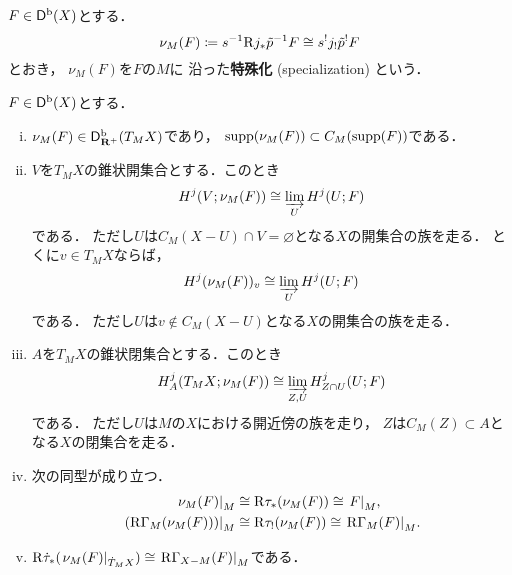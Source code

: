 \begin{DFN}
    \(F\in\Dompb(X)\)とする．
    \[ 
        \nu_{M}(F)\coloneqq 
        s^{-1}\Rder{j_{\ast}}\tilde{p}^{-1}F
        \cong
        s^{!}j_{!}\tilde{p}^{!}F
    \]
    とおき，
    \(\nu_{M}(F)\)を\(F\)の\(M\)に
    沿った\textbf{特殊化} (specialization) という．
\end{DFN}

\begin{THM}
    \(F\in\Dompb(X)\)とする．
    \begin{enumerate}[(i)]
        \item \(\nu_{M}(F)\in\Dbcon(T_{M}X)\)であり，
        \(\supp(\nu_{M}(F))\subset C_{M}(\supp(F))\)である．
        \item \(V\)を\(T_{M}X\)の錐状開集合とする．このとき\[
            H^{j}(V;\nu_{M}(F))
            \cong
            \indlim[U]H^{j}(U;F)
        \]である．
        ただし\(U\)は\(
            C_{M}(X-U)\cap V=\varnothing
        \)となる\(X\)の開集合の族を走る．
        とくに\(v\in T_{M}X\)ならば，
        \[
            H^{j}(\nu_{M}(F))_{v}
            \cong
            \indlim[U]H^{j}(U;F)
        \]である．
        ただし\(U\)は\(
            v\notin C_{M}(X-U)
        \)となる\(X\)の開集合の族を走る．
        \item \(A\)を\(T_{M}X\)の錐状閉集合とする．このとき\[
            H^{j}_{A}(T_{M}X;\nu_{M}(F))
            \cong
            \indlim[Z,U]H^{j}_{Z\cap U}(U;F)
        \]である．
        ただし\(U\)は\(
            M
        \)の\(X\)における開近傍の族を走り，
        \(Z\)は\(C_{M}(Z)\subset A\)となる\(X\)の閉集合を走る．
        \item 次の同型が成り立つ．\begin{align*}
            \mres[\nu_{M}(F)]{M}&\cong \Rder{\tau}_{\ast}(\nu_{M}(F))\cong \mres[F]{M},\\
            \mres[(\RG_{M}(\nu_{M}(F)))]{M}&\cong \Rder{\tau}_{!}(\nu_{M}(F))\cong \mres[\RG_{M}(F)]{M}.
        \end{align*}
        \item \(\Rder{\dot{\tau}}_{\ast}(\mres[\nu_{M}(F)]{\dot{T}_{M}X})\cong\mres[\RG_{X-M}(F)]{M}\)である．
    \end{enumerate}
\end{THM}

